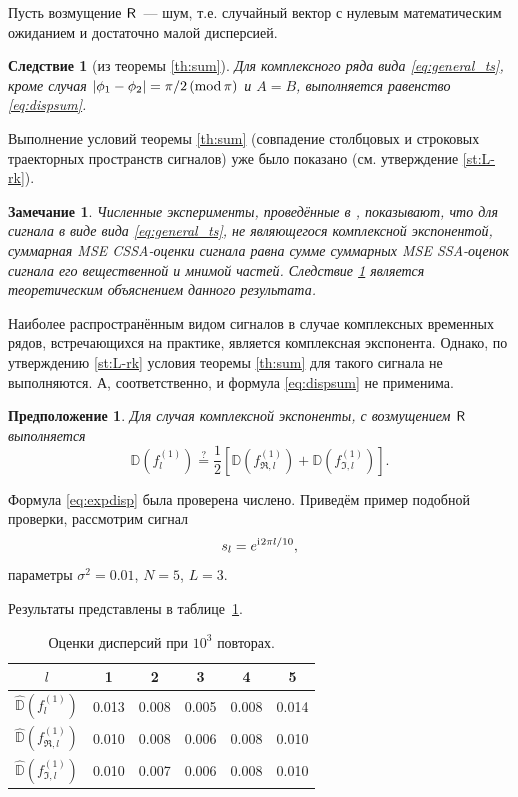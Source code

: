 \documentclass[specialist,
               substylefile = spbu.rtx,
               subf,href,colorlinks=true, 12pt]{disser}
\newtheorem{remark}{Замечание}
\newtheorem{corollary}{Следствие}
\newtheorem*{prop*}{Предположение}
\begin{document}
Пусть возмущение $\textsf{R}$~--- шум, т.е. случайный вектор с нулевым математическим ожиданием и достаточно малой дисперсией.

\begin{corollary}[из теоремы {\ref{th:sum}}] \label{cor:harm}
	Для комплексного ряда вида \eqref{eq:general_ts}, кроме случая $|\phi_1-\phi_2| = \pi/2\,(\mathop{\mathrm{mod}} \pi)$ и $A=B$,  выполняется равенство \eqref{eq:dispsum}.
\end{corollary}
Выполнение условий теоремы {\ref{th:sum}} (совпадение столбцовых и строковых траекторных пространств сигналов) уже было показано (см. утверждение \ref{st:L-rk}).

\begin{remark}
	Численные эксперименты, проведённые в \cite{Golyandina.etal2013}, показывают, что для сигнала в виде вида \eqref{eq:general_ts}, не являющегося комплексной экспонентой, суммарная MSE CSSA-оценки сигнала равна сумме суммарных MSE SSA-оценок сигнала его вещественной и мнимой частей. Следствие \ref{cor:harm} является теоретическим объяснением данного результата.
\end{remark}

Наиболее распространённым видом сигналов в случае комплексных временных рядов, встречающихся на практике, является комплексная экспонента. Однако, по утверждению \ref{st:L-rk} условия теоремы \ref{th:sum} для такого сигнала не выполняются. А, соответственно, и формула \eqref{eq:dispsum} не применима.

\begin{prop*}
	Для случая комплексной экспоненты, с возмущением $\textsf{R}$ выполняется
	\begin{equation} \label{eq:expdisp}
		\mathbb{D}(f^{(1)}_l) \stackrel{?}{=} \frac{1}{2}[\mathbb{D}(f^{(1)}_{\Re, l}) + \mathbb{D}(f^{(1)}_{\Im, l})].
	\end{equation}
\end{prop*}

Формула \eqref{eq:expdisp} была проверена числено. Приведём пример подобной проверки, рассмотрим сигнал
$$s_l = e^{\mathrm{i}\mkern1mu 2 \pi l / 10},$$
параметры $\sigma^2 = 0.01$, $N = 5$, $L = 3$.

Результаты представлены в таблице~\ref{tab:pi_div_2}.

\begin{table}[H]
	\begin{center}
		\caption{Оценки дисперсий при $10^3$ повторах.}
		\label{tab:pi_div_2}
		\begin{tabular}{|c|c|c|c|c|c|}
			\hline
			$l$	& 1 & 2 & 3 & 4 & 5\\
			\hline
			$\hat{\mathbb{D}}(f^{(1)}_l)$ & 0.013  & 0.008  & 0.005 & 0.008 & 0.014\\
			\hline
			$\hat{\mathbb{D}}(f^{(1)}_{\Re, l})$ & 0.010 & 0.008 & 0.006 & 0.008 & 0.010\\
			\hline
			$\hat{\mathbb{D}}(f^{(1)}_{\Im, l})$ & 0.010  & 0.007  & 0.006 & 0.008 & 0.010\\
			\hline
		\end{tabular}
	\end{center}
\end{table}
\end{document}
